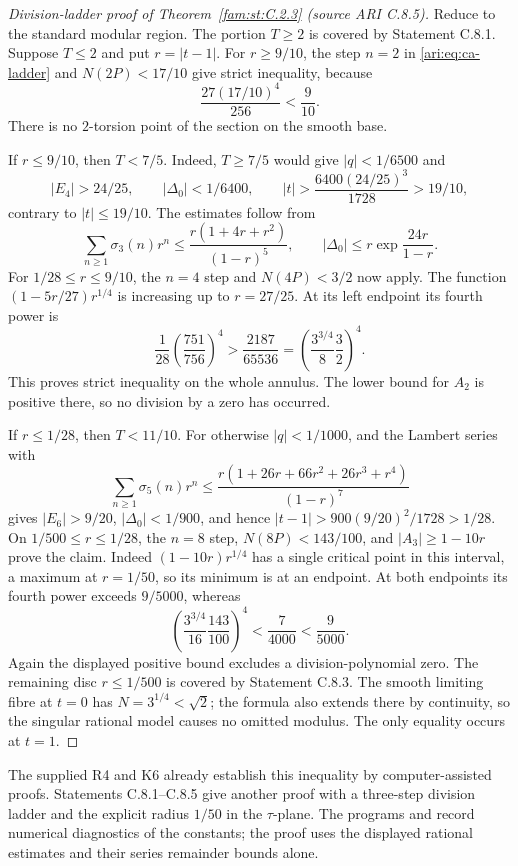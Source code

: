 \begin{proof}[Division-ladder proof of Theorem~\ref{fam:st:C.2.3} (source ARI C.8.5)]
Reduce to the standard modular region. The portion $T\ge2$
is covered by Statement C.8.1. Suppose $T\le2$ and put
$r=|t-1|$. For $r\ge9/10$, the step $n=2$ in
\eqref{ari:eq:ca-ladder} and $N(2P)<17/10$ give strict inequality,
because
\[
 \frac{27(17/10)^4}{256}<\frac9{10}.
\]
There is no $2$-torsion point of the section on the smooth base.

If $r\le9/10$, then $T<7/5$. Indeed, $T\ge7/5$ would give
$|q|<1/6500$ and
\[
 |E_4|>24/25,\qquad |\Delta_0|<1/6400,
 \qquad |t|>\frac{6400(24/25)^3}{1728}>19/10,
\]
contrary to $|t|\le19/10$. The estimates follow from
\[
 \sum_{n\ge1}\sigma_3(n)r^n
 \le\frac{r(1+4r+r^2)}{(1-r)^5},\qquad
 |\Delta_0|\le r\exp\frac{24r}{1-r}.
\]
For $1/28\le r\le9/10$, the $n=4$ step and
$N(4P)<3/2$ now apply. The function
$(1-5r/27)r^{1/4}$ is increasing up to $r=27/25$.
At its left endpoint its fourth power is
\[
 \frac1{28}\left(\frac{751}{756}\right)^4
 >\frac{2187}{65536}
 =\left(\frac{3^{3/4}}8\frac32\right)^4.
\]
This proves strict inequality on the whole annulus. The lower
bound for $A_2$ is positive there, so no division by a zero has
occurred.

If $r\le1/28$, then $T<11/10$. For otherwise $|q|<1/1000$,
and the Lambert series with
\[
 \sum_{n\ge1}\sigma_5(n)r^n
 \le\frac{r(1+26r+66r^2+26r^3+r^4)}{(1-r)^7}
\]
gives $|E_6|>9/20$, $|\Delta_0|<1/900$, and hence
$|t-1|>900(9/20)^2/1728>1/28$.
On $1/500\le r\le1/28$, the $n=8$ step,
$N(8P)<143/100$, and $|A_3|\ge1-10r$ prove the claim.
Indeed $(1-10r)r^{1/4}$ has a single critical point in this
interval, a maximum at $r=1/50$, so its minimum is at an endpoint.
At both endpoints its fourth power exceeds $9/5000$, whereas
\[
 \left(\frac{3^{3/4}}{16}\frac{143}{100}\right)^4
 <\frac7{4000}<\frac9{5000}.
\]
Again the displayed positive bound excludes a division-polynomial
zero. The remaining disc $r\le1/500$ is covered by Statement
C.8.3. The smooth limiting fibre at $t=0$ has
$N=3^{1/4}<\sqrt2$; the formula also extends there by
continuity, so the singular rational model causes no omitted
modulus. The only equality occurs at $t=1$.
\end{proof}

The supplied R4 and K6 already establish this inequality by
computer-assisted proofs. Statements C.8.1--C.8.5 give another
proof with a three-step division ladder and the explicit radius
$1/50$ in the $\tau$-plane. The programs
 and
 record numerical diagnostics
of the constants; the proof uses the displayed rational estimates
and their series remainder bounds alone.
